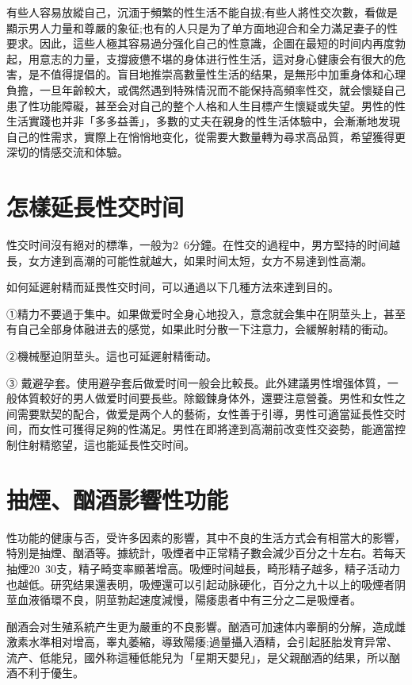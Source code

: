\documentclass[12pt,UTF8]{ctexbook}
\begin{document}
有些人容易放縱自己，沉湎于頻繁的性生活不能自拔;有些人將性交次數，看做是顯示男人力量和尊嚴的象征;也有的人只是为了单方面地迎合和全力滿足妻子的性要求。因此，這些人極其容易過分强化自己的性意識，企圖在最短的时间内再度勃起，用意志的力量，支撐疲憊不堪的身体进行性生活，這对身心健康会有很大的危害，是不值得提倡的。盲目地推崇高數量性生活的结果，是無形中加重身体和心理負擔，一旦年齡較大，或偶然遇到特殊情況而不能保持高頻率性交，就会懷疑自己患了性功能障礙，甚至会对自己的整个人格和人生目標产生懷疑或失望。男性的性生活實踐也并非「多多益善」，多數的丈夫在親身的性生活体驗中，会漸漸地发現自己的性需求，實際上在悄悄地变化，從需要大數量轉为尋求高品質，希望獲得更深切的情感交流和体驗。

\section{怎樣延長性交时间}

性交时间沒有絕对的標準，一般为2~6分鐘。在性交的過程中，男方堅持的时间越長，女方達到高潮的可能性就越大，如果时间太短，女方不易達到性高潮。

如何延遲射精而延畏性交时间，可以通過以下几種方法來達到目的。

①精力不要過于集中。如果做爱时全身心地投入，意念就会集中在阴莖头上，甚至有自己全部身体融进去的感觉，如果此时分散一下注意力，会緩解射精的衝动。

②機械壓迫阴莖头。這也可延遲射精衝动。

③ 戴避孕套。使用避孕套后做爱时间一般会比較長。此外建議男性增强体質，一般体質較好的男人做爱时间要長些。除鍛鍊身体外，還要注意營養。男性和女性之间需要默契的配合，做爱是两个人的藝術，女性善于引導，男性可適當延長性交时间，而女性可獲得足夠的性滿足。男性在即將達到高潮前改变性交姿勢，能適當控制住射精慾望，這也能延長性交时间。

\section{抽煙、酗酒影響性功能}

性功能的健康与否，受许多因素的影響，其中不良的生活方式会有相當大的影響，特別是抽煙、酗酒等。據統計，吸煙者中正常精子數会減少百分之十左右。若每天抽煙20~30支，精子畸变率顯著增高。吸煙时间越長，畸形精子越多，精子活动力也越低。研究结果還表明，吸煙還可以引起动脉硬化，百分之九十以上的吸煙者阴莖血液循環不良，阴莖勃起速度減慢，陽痿患者中有三分之二是吸煙者。

酗酒会对生殖系統产生更为嚴重的不良影響。酗酒可加速体内睾酮的分解，造成雌激素水準相对增高，睾丸萎縮，導致陽痿;過量攝入酒精，会引起胚胎发育异常、流产、低能兒，國外称這種低能兒为「星期天嬰兒」，是父親酗酒的结果，所以酗酒不利于優生。
\end{document}
